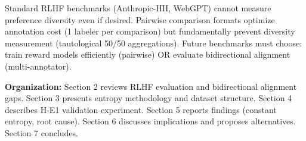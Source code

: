 Standard RLHF benchmarks (Anthropic-HH, WebGPT) cannot measure preference diversity even if desired. Pairwise comparison formats optimize annotation cost (1 labeler per comparison) but fundamentally prevent diversity measurement (tautological 50/50 aggregations). Future benchmarks must choose: train reward models efficiently (pairwise) OR evaluate bidirectional alignment (multi-annotator).

\textbf{Organization:} Section 2 reviews RLHF evaluation and bidirectional alignment gaps. Section 3 presents entropy methodology and dataset structure. Section 4 describes H-E1 validation experiment. Section 5 reports findings (constant entropy, root cause). Section 6 discusses implications and proposes alternatives. Section 7 concludes.

